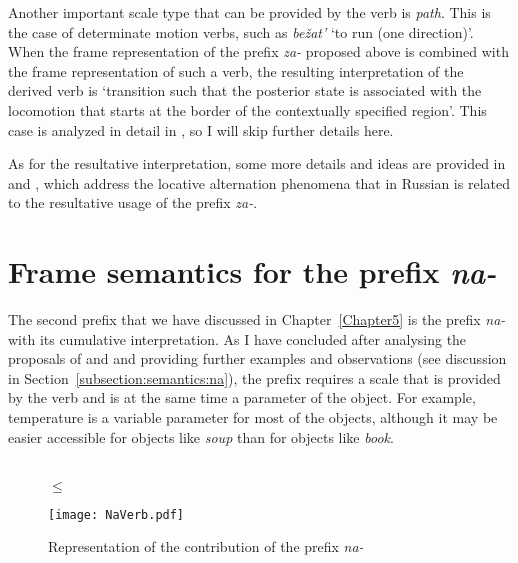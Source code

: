 Another important scale type that can be provided by the verb is \textit{path}. This is the case of determinate motion verbs, such as \textit{be\v{z}at'} `to run (one direction)'. When the frame representation of the prefix \textit{za-} proposed above is combined with the frame representation of such a verb, the resulting interpretation of the derived verb is `transition such that the posterior state is associated with the locomotion that starts at the border of the contextually specified region'. This case is analyzed in detail in \citet{ZinovaOsswald:paper}, so I will skip further details here.

As for the resultative interpretation, some more details and ideas are provided in \citealt{ZinovaKallmeyer:12} and \citealt{Zinova:14}, which address the locative alternation phenomena that in Russian is related to the resultative usage of the prefix \textit{za-}. 

\section{Frame semantics for the prefix \textit{na-}}\label{section:frame:na}
The second prefix that we have discussed in Chapter~\ref{Chapter5} is the prefix \textit{na-} with its cumulative interpretation. As I have concluded after analysing the proposals of \citet{Filip:00} and \citet{Kagan:book} and providing further examples and observations (see discussion in Section~\ref{subsection:semantics:na}), the prefix requires a scale that is provided by the verb and is at the same time a parameter of the object. For example, temperature is a variable parameter for most of the objects, although it may be easier accessible for objects like \textit{soup} than for objects like \textit{book}.


\begin{figure}
\begin{minipage}{0.4\textwidth}
\\
\vspace{1cm}
\centering
{} $\leq$ 
\end{minipage}
\hfill
\begin{minipage}{0.4\textwidth}
\texttt{[image: NaVerb.pdf]}\\
\end{minipage}
\caption{Representation of the contribution of the prefix \textit{na-}\label{frame:na}}
\end{figure}

